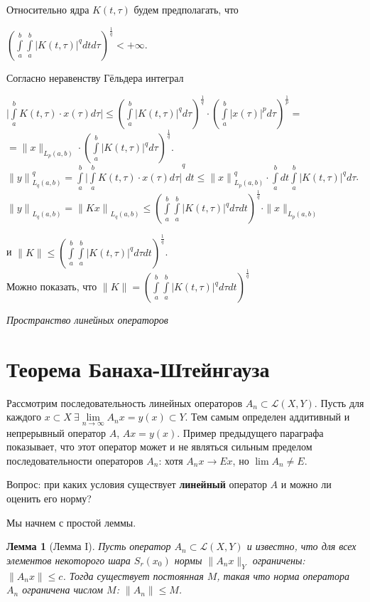 \documentclass[12pt,a4paper,titlepage]{book}
\theoremstyle{definition}
\theoremstyle{plain}
\theoremstyle{remark}
\theoremstyle{remark}
\theoremstyle{remark}
\theoremstyle{plain}
\newtheorem*{lemma}{Лемма}
\begin{document}
Относительно ядра $K(t,\tau)$ будем предполагать, что 
\begin{center}
${(\int\limits_a^b \int\limits_a^b {\vert K(t,\tau)\vert} ^q dtd\tau)^\frac{1}{q}} <+\infty$.
\end{center}

Согласно неравенству Гёльдера интеграл 
\begin{center}
$\vert \int\limits_a^b K(t,\tau)\cdot x(\tau)d\tau \vert \leq (\int\limits_a^b {\vert K(t,\tau)\vert} ^q d\tau)^\frac{1}{q} \cdot {(\int\limits_a^b {\vert x(\tau)\vert} ^p d\tau)}^\frac{1}{p}=$
\\ 
$= \parallel x \parallel _{L_p(a,b)}\cdot (\int\limits_a^b {\vert K(t,\tau)\vert} ^q d\tau)^\frac{1}{q}$.
\\ 
${\parallel y \parallel}^q _{L_q(a,b)}=\int\limits_a^b {\vert \int\limits_a^b K(t,\tau)\cdot x(\tau)d\tau \vert}^{q} dt\leq {\parallel x \parallel}^q _{L_p(a,b)} \cdot \int\limits_a^b dt \int\limits_a^b {\vert K(t,\tau)\vert} ^q d\tau$.
\\
${\parallel y \parallel}_{L_q(a,b)}=
{\parallel Kx\parallel}_{L_q(a,b)} \leq {(\int\limits_a^b \int\limits_a^b {\vert K(t,\tau)\vert} ^q d\tau dt)^\frac{1}{q}}\cdot \parallel x \parallel _{L_p(a,b)} $ 
\end{center}
и $\parallel K \parallel \leq {(\int\limits_a^b \int\limits_a^b {\vert K(t,\tau)\vert} ^q d\tau dt)^\frac{1}{q}}$.
\\
Можно показать, что $\parallel K \parallel = 
{(\int\limits_a^b \int\limits_a^b {\vert K(t,\tau)\vert} ^q d\tau dt)^\frac{1}{q}}$

\emph{Пространство линейных операторов}

\section{Теорема Банаха-Штейнгауза}
Рассмотрим последовательность линейных операторов $A_n \subset \mathcal{L}(X,Y)$. Пусть для каждого $x \subset X\ \exists \lim\limits_{n\to \infty}A_n x = y(x) \subset Y$. Тем самым определен аддитивный и непрерывный оператор $A$, $Ax = y(x)$. Пример предыдущего параграфа показывает, что этот оператор может и не являться сильным пределом последовательности операторов $A_n$: хотя $A_n x \to E x$, но $\lim A_n \ne E$.

Вопрос: при каких условия существует \textbf{линейный} оператор $A$ и можно ли оценить его норму?

Мы начнем с простой леммы.

\begin{lemma}[Лемма I]
Пусть оператор $A_n \subset \mathcal{L}(X,Y)$ и известно, что для всех элементов некоторого шара $S_r(x_0)$ нормы $\lVert A_n x\rVert_Y$ ограничены: $\lVert A_n x\rVert \le c$. Тогда существует постоянная $M$, такая что норма оператора $A_n$ ограничена числом $M$: $\lVert A_n \rVert \le M$.
\end{lemma}
\end{document}
